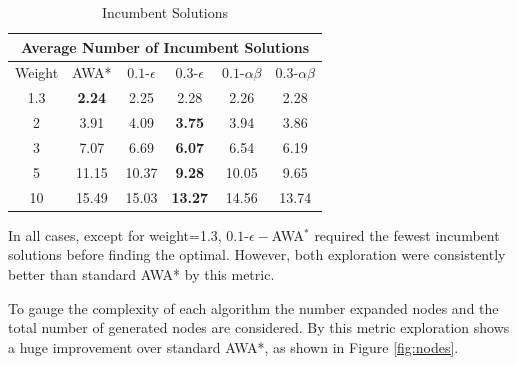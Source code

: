 \begin{table}
\def\arraystretch{1.3}
\begin{tabular}{ |c||c|c|c|c|c|  }
    \hline
    \multicolumn{6}{|c|}{Average Number of Incumbent Solutions} \\
    \hline
    Weight& AWA* & $0.1$-$\epsilon$ &$0.3$-$\epsilon$&$0.1$-$\alpha \beta$ & $0.3$-$\alpha \beta$\\
    \hline
    1.3 & \textbf{2.24} & 2.25 & 2.28 & 2.26 & 2.28\\
    \hline
    2 & 3.91 & 4.09 & \textbf{3.75} & 3.94 & 3.86\\
    \hline
    3 & 7.07 & 6.69 & \textbf{6.07} & 6.54 & 6.19\\
    \hline
    5 & 11.15 & 10.37 & \textbf{9.28} & 10.05 & 9.65\\
    \hline
    10& 15.49 & 15.03 & \textbf{13.27} & 14.56 & 13.74\\
    \hline
\end{tabular}
\caption{Incumbent Solutions}\label{tad:num-sol}
\end{table}

In all cases, except for weight=1.3, $0.1$-$\epsilon-$AWA$^*$ required the fewest incumbent solutions before finding the optimal. However, both exploration were consistently better than standard AWA* by this metric. 

To gauge the complexity of each algorithm the number expanded nodes and the total number of generated nodes are considered. By this metric exploration shows a huge improvement over standard AWA*, as shown in Figure \ref{fig:nodes}.

